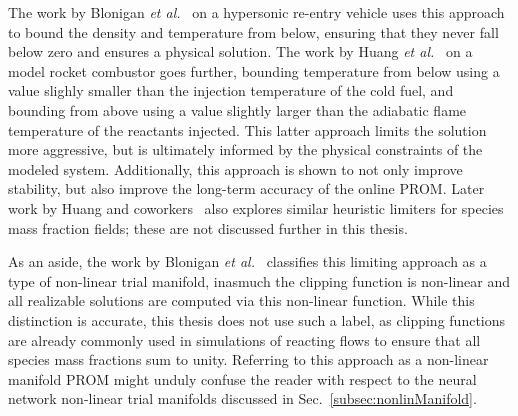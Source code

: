 The work by Blonigan \textit{et al.}~\cite{Blonigan2020} on a hypersonic re-entry vehicle uses this approach to bound the density and temperature from below, ensuring that they never fall below zero and ensures a physical solution. The work by Huang \textit{et al.}~\cite{Huang2019} on a model rocket combustor goes further, bounding temperature from below using a value slighly smaller than the injection temperature of the cold fuel, and bounding from above using a value slightly larger than the adiabatic flame temperature of the reactants injected. This latter approach limits the solution more aggressive, but is ultimately informed by the physical constraints of the modeled system. Additionally, this approach is shown to not only improve stability, but also improve the long-term accuracy of the online PROM. Later work by Huang and coworkers~\cite{Huang2020,Huang2022} also explores similar heuristic limiters for species mass fraction fields; these are not discussed further in this thesis.

As an aside, the work by Blonigan \textit{et al.}~\cite{Blonigan2020} classifies this limiting approach as a type of non-linear trial manifold, inasmuch the clipping function is non-linear and all realizable solutions are computed via this non-linear function. While this distinction is accurate, this thesis does not use such a label, as clipping functions are already commonly used in simulations of reacting flows to ensure that all species mass fractions sum to unity. Referring to this approach as a non-linear manifold PROM might unduly confuse the reader with respect to the neural network non-linear trial manifolds discussed in Sec.~\ref{subsec:nonlinManifold}.